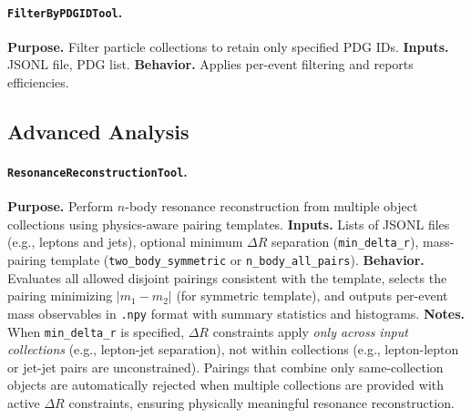 \documentclass[11pt,oneside]{article}
\numberwithin{equation}{section}
\begin{document}
\begin{appendix}
\paragraph{\texttt{FilterByPDGIDTool}.}
\textbf{Purpose.} Filter particle collections to retain only specified PDG IDs.  
\textbf{Inputs.} JSONL file, PDG list.  
\textbf{Behavior.} Applies per-event filtering and reports efficiencies.  


\subsection{Advanced Analysis}

\paragraph{\texttt{ResonanceReconstructionTool}.}
\textbf{Purpose.} Perform $n$-body resonance reconstruction from multiple object collections using physics-aware pairing templates.
\textbf{Inputs.} Lists of JSONL files (e.g., leptons and jets), optional minimum $\Delta R$ separation (\texttt{min\_delta\_r}), mass-pairing template (\texttt{two\_body\_symmetric} or \texttt{n\_body\_all\_pairs}).
\textbf{Behavior.} Evaluates all allowed disjoint pairings consistent with the template, selects the pairing minimizing $|m_1 - m_2|$ (for symmetric template), and outputs per-event mass observables in \texttt{.npy} format with summary statistics and histograms.
\textbf{Notes.} When \texttt{min\_delta\_r} is specified, $\Delta R$ constraints apply \emph{only across input collections} (e.g., lepton-jet separation), not within collections (e.g., lepton-lepton or jet-jet pairs are unconstrained). Pairings that combine only same-collection objects are automatically rejected when multiple collections are provided with active $\Delta R$ constraints, ensuring physically meaningful resonance reconstruction.

\end{appendix}

\newpage
{}

\end{document}
